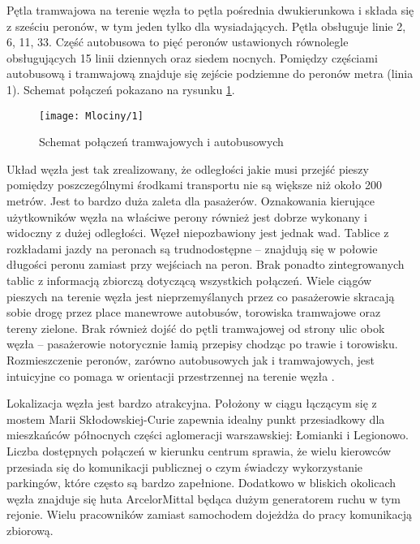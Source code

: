 \documentclass[twoside,12pt]{article}
\begin{document}
	Pętla tramwajowa na terenie węzła to pętla pośrednia dwukierunkowa i składa się z sześciu peronów, w tym jeden tylko dla wysiadających. Pętla obsługuje linie 2, 6, 11, 33. Część autobusowa to pięć peronów ustawionych równolegle obsługujących 15 linii dziennych oraz siedem nocnych. Pomiędzy częściami autobusową i tramwajową znajduje się zejście podziemne do peronów metra (linia 1). Schemat połączeń pokazano na rysunku \ref{mlociny3}.
	
	\begin{figure}[H]
		\centering
		\texttt{[image: Mlociny/1]}\\
		\caption{Schemat połączeń tramwajowych i autobusowych}
		\label{mlociny3}
	\end{figure}		
	
	Układ węzła jest tak zrealizowany, że odległości jakie musi przejść pieszy pomiędzy poszczególnymi środkami transportu nie są większe niż około 200 metrów. Jest to bardzo duża zaleta dla pasażerów. Oznakowania kierujące użytkowników węzła na właściwe perony również jest dobrze wykonany i widoczny z dużej odległości. Węzeł niepozbawiony jest jednak wad. Tablice z rozkładami jazdy na peronach są trudnodostępne -- znajdują się w połowie długości peronu zamiast przy wejściach na peron. Brak ponadto zintegrowanych tablic z informacją zbiorczą dotyczącą wszystkich połączeń. Wiele ciągów pieszych na terenie węzła jest nieprzemyślanych przez co pasażerowie skracają sobie drogę przez place manewrowe autobusów, torowiska tramwajowe oraz tereny zielone. Brak również dojść do pętli tramwajowej od strony ulic obok węzła -- pasażerowie notorycznie łamią przepisy chodząc po trawie i torowisku. Rozmieszczenie peronów, zarówno autobusowych jak i tramwajowych, jest intuicyjne co pomaga w orientacji przestrzennej na terenie węzła \cite{mlociny4}.
	
	Lokalizacja węzła jest bardzo atrakcyjna. Położony w ciągu łączącym się z mostem Marii Skłodowskiej-Curie zapewnia idealny punkt przesiadkowy dla mieszkańców północnych części aglomeracji warszawskiej: Łomianki i Legionowo. Liczba dostępnych połączeń w kierunku centrum sprawia, że wielu kierowców przesiada się do komunikacji publicznej o czym świadczy wykorzystanie parkingów, które często są bardzo zapełnione. Dodatkowo w bliskich okolicach węzła znajduje się huta ArcelorMittal będąca dużym generatorem ruchu w tym rejonie. Wielu pracowników zamiast samochodem dojeżdża do pracy komunikacją zbiorową. 
	
\end{document}

